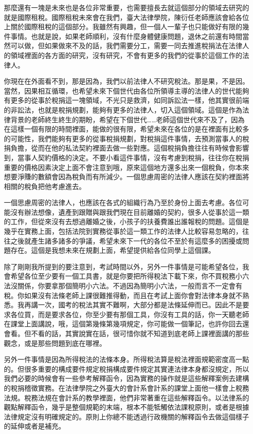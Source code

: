 \documentclass[oneside,sub3section]{ctexbook}
\begin{document}
那麼還有一塊是未來也是各位非常重要，也需要擅長去就這個部分的領域去研究的就是國際租稅。國際租稅未來會在我們，臺大法律學院，陳衍任老師應該會給各位上關於國際租稅的這個部分。我雖然有興趣，但一個人一輩子也只能做好有限的幾件事情。也就是說，如果老師順利，沒有什麼身體健康問題，退休之前還有時間當然可以做，但如果做來不及的話，我們需要分工，需要一同去推進稅捐法在法律人的領域裡面的各方面的研究，沒有研究，不會有更多的我們的從事於這個工作的法律人。

你現在在外面看不到，那是因為，我們以前法律人不研究稅法。那是果，不是因。當然，因果相互循環，也希望未來下個世代由各位所領導主導的法律人的世代能夠有更多的從事於稅捐這一塊領域，不光只是救濟，如同訴訟法一樣，他其實很前端的非訟法，也就是稅捐規劃，能夠有更多的法律人，切入這個領域。這個是作為法律背景的老師終生終生的期盼，希望在下個世代\ldots\ldots 老師這個世代來不及了，因為在這樣一個有限的時間裡面，能做的很有限，希望未來在各位的是在裡面有比較多的可能性，我們能夠有更多的從事稅捐規劃，對稅捐這件事情，去預測當事人的稅捐負擔，從而在他的私法契約裡面去做一些對應。這個稅捐負擔往往有時候會影響到，當事人契約價格的決定。不要小看這件事情，沒有考慮到稅捐，往往你在稅捐重要的價格因素決定上面不會注意到哦，原來這個地方還多出來一個稅負，你本來想要淨賺的數額會因為稅負而有所減少。一個思慮周密的法律人應該在契約裡面將相關的稅負把他考慮進去。

一個思慮周密的法律人，也應該在各式的組織行為乃至於身份上面去考慮。各位可能沒有辦法想像，遺產到跟贈與跟我們現在目前離婚的契約，很多人從事於這一類的工作，但從來沒有去想過離婚之後，小孩子的扶養費誰出誰報稅的問題。這個是幾乎在實務上面，包括法院到實務從事於這一類工作的法律人比較容易忽略的，往往之後就產生諸多諸多的爭議，希望未來下一代的各位不至於有這麼多的困擾或問題存在。這個是我想未來在規劃上面，希望提供給各位同學上這個課。

除了剛剛我所提到的要注意到，考試時間以外，另外一件事情是可能希望各位，我會希望各位至少要有一個工具書，就是你要把所得稅法下載下來，你不買稅務小六法沒關係，你要拿那個簡明小六法。不過因為簡明小六法，一般而言不一定會有稅。你如果沒有法條老師上課很難推得動，而且在考試上面你會對法律本身就不熟悉。我再講一次，國考的稅法其實不難啊，大部分都是法條延伸而已。因此不是要求各位買，而是要求各位，你至少要有那個工具，你沒有工具的話，你一天聽老師在課堂上面講說，哦，這個第幾條第幾項規定，你可能做一個筆記，也許你回去還會看。但不看的話，其實說實在話，很可惜你就不知道到底老師上課裡面講的那些觀念，或是那些問題到底在哪裡。

另外一件事情是因為所得稅法的法條本身。所得稅法算是稅法裡面規範密度高一點的。但很多重要的構成要件規定稅捐構成要件規定其實連法律本身都沒規定，所以我們必要的時候會有一些參考解釋函令，因為實務的操作就是這些解釋案例去建構的稅捐稽徵實務。在法律學院之外臺大的會計系會計系的課堂上面他一樣會上稅務法規。稅務法規在會計系的教學裡面，他們非常著重在這些解釋函令。以法律系的觀點解釋函令，幾乎是整個規範的末端，根本不能牴觸依法課稅原則，或者是根據法律規定沒有明確規定的。原則上你總不能透過行政機關的解釋函令去做這個樣子的延伸或者是補充。
\end{document}
